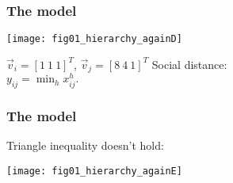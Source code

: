  
% 


\begin{frame}
  \frametitle{The model}

  \begin{center}
    \texttt{[image: fig01\_hierarchy\_againD]}
  \end{center}

  \begin{center}

    $\vec{v}_i = [ 1 \  1 \ 1 ]^T$, $\vec{v}_j = [ 8 \ 4 \ 1]^T$ \hfill
    Social distance:\\
    \hfill
    $ \boxed{y_{ij} = \min_h x^h_{ij}.} $

  \end{center}

\end{frame}

% 
% 
% 
% 
%     
% 
% 
% 


\begin{frame}
  \frametitle{The model}

  \begin{block}{Triangle inequality doesn't hold:}
    \begin{center}
      \texttt{[image: fig01\_hierarchy\_againE]}
    \end{center}

    \begin{center}
    \end{center}
  \end{block}

\end{frame}


